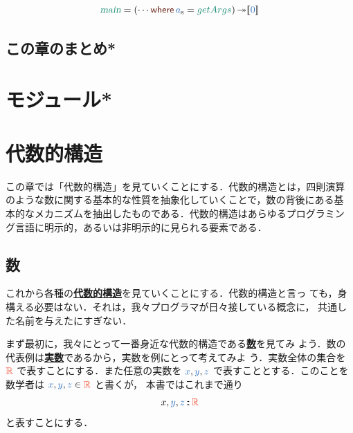 \documentclass[a5paper,twoside,fleqn,draft]{jsbook}
\def\[{[\![}
\def\]{]\!]}
\def\keywordColor{Sepia}
\def\varColor{NavyBlue}
\def\actionColor{PineGreen}
\def\typeColor{RedOrange}
\newenvironment{leader}{\begingroup\gt}{\endgroup}
\newcommand{\keyword}[1]{{\underline{\textbf{#1}}}}
\newcommand{\mKeyword}[1]{\textcolor{\keywordColor}{\mathsf{#1}}}
\newcommand{\mWhereKeyword}{\mKeyword{where}}
\DeclareMathOperator{\mWhere}{\mWhereKeyword}
\newcommand{\mVar}[1]{\textcolor{\varColor}{#1}}
\newcommand{\mXVar}{\mVar{x}}
\newcommand{\mYVar}{\mVar{y}}
\newcommand{\mZVar}{\mVar{z}}
\newcommand{\mAction}[1]{\textcolor{\actionColor}{#1}}
\newcommand{\mActionLong}[1]{\textcolor{\actionColor}{\textsl{#1}}}
\DeclareMathOperator{\mMain}{\mActionLong{main}}
\DeclareMathOperator{\mBindRightIgnore}{\twoheadrightarrow}
\DeclareMathOperator{\mIn}{{:\!:}}
\newcommand{\mSpecialSet}[1]{\textcolor{\typeColor}{\mathbb{#1}}}
\newcommand{\mRSet}{\mSpecialSet{R}}
\newcommand{\mPureWith}[1]{\[\mVar{#1}\]}
\newcommand{\mList}[1]{\mVar{#1}_\mathrm{s}}
\begin{document}
\begin{equation}
\mMain=(\dotsb\mWhere{}\mList{a}=\mAction{getArgs})\mBindRightIgnore\mPureWith{0}
\end{equation}

\section{この章のまとめ*}



\chapter{モジュール*}
\label{ch:module}

\chapter{代数的構造}
\label{ch:algebra}

\begin{leader}
この章では「代数的構造」を見ていくことにする．代数的構造とは，四則演算
のような数に関する基本的な性質を抽象化していくことで，数の背後にある基
本的なメカニズムを抽出したものである．代数的構造はあらゆるプログラミン
グ言語に明示的，あるいは非明示的に見られる要素である．
\end{leader}

\section{数}

これから各種の\keyword{代数的構造}を見ていくことにする．代数的構造と言っ
ても，身構える必要はない．それは，我々プログラマが日々接している概念に，
共通した名前を与えたにすぎない．

まず最初に，我々にとって一番身近な代数的構造である\keyword{数}を見てみ
よう．数の代表例は\keyword{実数}であるから，実数を例にとって考えてみよ
う．実数全体の集合を $\mRSet$ で表すことにする．また任意の実数を
$\mXVar,\mYVar,\mZVar$ で表すこととする．このことを数学者は $\mXVar,\mYVar,\mZVar\in\mRSet$ と書くが，
本書ではこれまで通り
\begin{equation}
x,\mYVar,\mZVar\mIn\mRSet
\end{equation}
と表すことにする．
\end{document}

